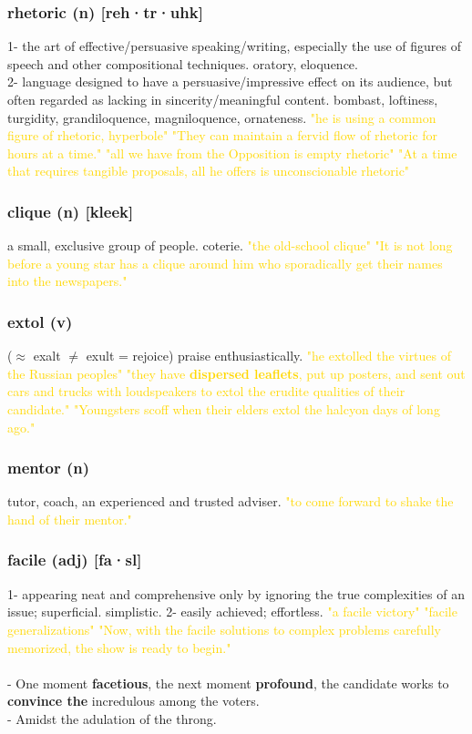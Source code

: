 \documentclass{proc}
\begin{document}
	\subsubsection{\textcolor{brickred}{rhetoric} (n) [reh·tr·uhk]}
	1- the art of effective/persuasive speaking/writing, especially the use of figures of speech and other compositional techniques. oratory, eloquence.\\
	2- language designed to have a persuasive/impressive effect on its audience, but often regarded as lacking in sincerity/meaningful content. 
	bombast, 
	loftiness, 
	turgidity, 
	grandiloquence, 
	magniloquence, 
	ornateness.
	\textcolor{gold}{"he is using a common figure of rhetoric, hyperbole" "They can maintain a fervid flow of rhetoric for hours at a time." "all we have from the Opposition is empty rhetoric" "At a time that requires tangible proposals, all he offers is unconscionable rhetoric"}
	
	\subsubsection{\textcolor{brickred}{clique} (n) [kleek]}
	a small, exclusive group of people. coterie.
	\textcolor{gold}{"the old-school clique" "It is not long before a young star has a clique around him who sporadically get their names into the newspapers."}
	
	\subsubsection{\textcolor{brickred}{extol} (v)}
	($\approx$ exalt $\neq$ exult = rejoice) praise enthusiastically.
	\textcolor{gold}{"he extolled the virtues of the Russian peoples" "they have \textbf{dispersed leaflets}, put up posters, and sent out cars and trucks with loudspeakers to extol the erudite qualities of their candidate." "Youngsters scoff when their elders extol the halcyon days of long ago."}
	
	\subsubsection{\textcolor{brickred}{mentor} (n)}
	tutor,
	coach, an experienced and trusted adviser.
	\textcolor{gold}{ "to come forward to shake the hand of their mentor."}
	
	\subsubsection{\textcolor{brickred}{facile} (adj) [fa·sl]}
	1- appearing neat and comprehensive only by ignoring the true complexities of an issue; superficial. simplistic.
	2- easily achieved; effortless.
	\textcolor{gold}{"a facile victory" "facile generalizations" "Now, with the facile solutions to complex problems carefully memorized, the show is ready to begin."}\\\\
	- One moment \textbf{facetious}, the next moment \textbf{profound}, the candidate works to \textbf{convince the} incredulous among the voters.\\
	- Amidst the adulation of the throng.
	
\end{document}
